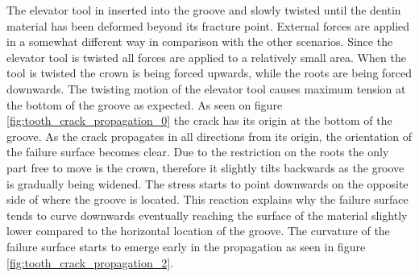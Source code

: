 The elevator tool in inserted into the groove and slowly twisted until
the dentin material has been deformed beyond its fracture
point. External forces are applied in a somewhat different way in
comparison with the other scenarios. Since the elevator tool is twisted
all forces are applied to a relatively small area. When the tool is
twisted the crown is being forced upwards, while the roots
are being forced downwards. The twisting motion of
the elevator tool causes maximum tension at the bottom of the groove
as expected. As seen on figure \vref{fig:tooth_crack_propagation_0} the
crack has its origin at the bottom of the groove. As the crack
propagates in all directions from its origin, the orientation of the
failure surface becomes clear. Due to the restriction on the roots the
only part free to move is the
crown, therefore it slightly tilts backwards
as the groove is gradually being widened. The stress starts to point
downwards on the opposite side of where the groove is located. This
reaction explains why the failure surface tends to curve
downwards eventually reaching the surface of the material slightly
lower compared to the horizontal location of the groove. The curvature of the
failure surface starts to emerge early in the propagation as seen in
figure \ref{fig:tooth_crack_propagation_2}.

